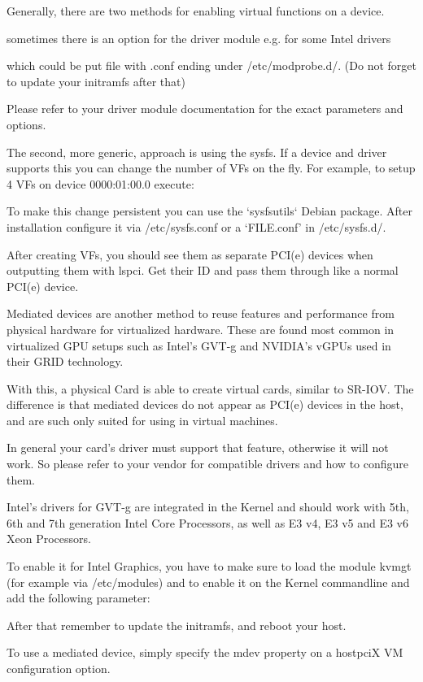 Generally, there are two methods for enabling virtual functions on a device.

sometimes there is an option for the driver module e.g. for some Intel drivers

which could be put file with .conf ending under /etc/modprobe.d/. (Do not forget to update your initramfs after that)

Please refer to your driver module documentation for the exact parameters and options.

The second, more generic, approach is using the sysfs. If a device and driver supports this you can change the number of VFs on the fly. For example, to setup 4 VFs on device 0000:01:00.0 execute:

To make this change persistent you can use the ‘sysfsutils` Debian package. After installation configure it via /etc/sysfs.conf or a `FILE.conf’ in /etc/sysfs.d/.

After creating VFs, you should see them as separate PCI(e) devices when outputting them with lspci. Get their ID and pass them through like a normal PCI(e) device.

Mediated devices are another method to reuse features and performance from physical hardware for virtualized hardware. These are found most common in virtualized GPU setups such as Intel’s GVT-g and NVIDIA’s vGPUs used in their GRID technology.

With this, a physical Card is able to create virtual cards, similar to SR-IOV. The difference is that mediated devices do not appear as PCI(e) devices in the host, and are such only suited for using in virtual machines.

In general your card’s driver must support that feature, otherwise it will not work. So please refer to your vendor for compatible drivers and how to configure them.

Intel’s drivers for GVT-g are integrated in the Kernel and should work with 5th, 6th and 7th generation Intel Core Processors, as well as E3 v4, E3 v5 and E3 v6 Xeon Processors.

To enable it for Intel Graphics, you have to make sure to load the module kvmgt (for example via /etc/modules) and to enable it on the Kernel commandline and add the following parameter:

After that remember to update the initramfs, and reboot your host.

To use a mediated device, simply specify the mdev property on a hostpciX VM configuration option.

